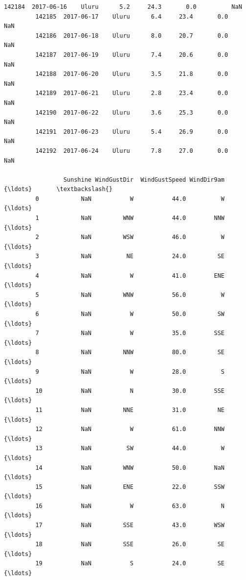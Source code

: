 \documentclass[11pt]{article}
\begin{document}
\begin{Verbatim}[commandchars=\\\{\}]
         142184  2017-06-16    Uluru      5.2     24.3       0.0          NaN   
         142185  2017-06-17    Uluru      6.4     23.4       0.0          NaN   
         142186  2017-06-18    Uluru      8.0     20.7       0.0          NaN   
         142187  2017-06-19    Uluru      7.4     20.6       0.0          NaN   
         142188  2017-06-20    Uluru      3.5     21.8       0.0          NaN   
         142189  2017-06-21    Uluru      2.8     23.4       0.0          NaN   
         142190  2017-06-22    Uluru      3.6     25.3       0.0          NaN   
         142191  2017-06-23    Uluru      5.4     26.9       0.0          NaN   
         142192  2017-06-24    Uluru      7.8     27.0       0.0          NaN   
         
                 Sunshine WindGustDir  WindGustSpeed WindDir9am      {\ldots}       \textbackslash{}
         0            NaN           W           44.0          W      {\ldots}        
         1            NaN         WNW           44.0        NNW      {\ldots}        
         2            NaN         WSW           46.0          W      {\ldots}        
         3            NaN          NE           24.0         SE      {\ldots}        
         4            NaN           W           41.0        ENE      {\ldots}        
         5            NaN         WNW           56.0          W      {\ldots}        
         6            NaN           W           50.0         SW      {\ldots}        
         7            NaN           W           35.0        SSE      {\ldots}        
         8            NaN         NNW           80.0         SE      {\ldots}        
         9            NaN           W           28.0          S      {\ldots}        
         10           NaN           N           30.0        SSE      {\ldots}        
         11           NaN         NNE           31.0         NE      {\ldots}        
         12           NaN           W           61.0        NNW      {\ldots}        
         13           NaN          SW           44.0          W      {\ldots}        
         14           NaN         WNW           50.0        NaN      {\ldots}        
         15           NaN         ENE           22.0        SSW      {\ldots}        
         16           NaN           W           63.0          N      {\ldots}        
         17           NaN         SSE           43.0        WSW      {\ldots}        
         18           NaN         SSE           26.0         SE      {\ldots}        
         19           NaN           S           24.0         SE      {\ldots}        

\end{Verbatim}
\end{document}
